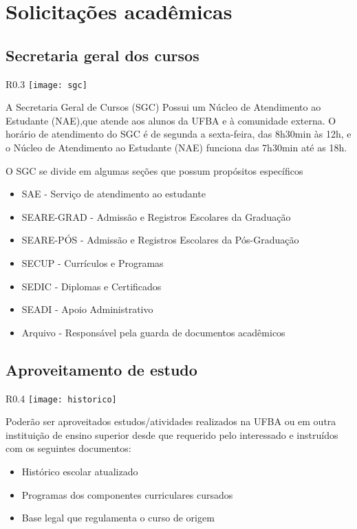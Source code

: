\chapter{Solicitações acadêmicas}
\DoPToC
	\section{Secretaria geral dos cursos}
	   \begin{wrapfigure}{R}{0.3\textwidth}
            \centering
            \texttt{[image: sgc]}
        \end{wrapfigure}
            
A Secretaria Geral de Cursos (SGC) Possui um Núcleo de Atendimento ao Estudante (NAE),que atende aos alunos da UFBA e à comunidade externa. O horário de atendimento do SGC é de segunda a sexta-feira, das 8h30min às 12h, e o Núcleo de Atendimento ao Estudante (NAE) funciona das 7h30min até as 18h.
               
O SGC se divide em algumas seções que possum propósitos específicos

\begin{itemize}
    \item SAE - Serviço de atendimento ao estudante
    \item SEARE-GRAD - Admissão e Registros Escolares da Graduação
    \item SEARE-PÓS - Admissão e Registros Escolares da Pós-Graduação
    \item SECUP - Currículos e Programas
    \item SEDIC - Diplomas e Certificados
    \item SEADI - Apoio Administrativo
    \item Arquivo - Responsável pela guarda de documentos acadêmicos
\end{itemize}


\section{Aproveitamento de estudo}
     \begin{wrapfigure}{R}{0.4\textwidth}
            \centering
            \texttt{[image: historico]}
        \end{wrapfigure}
            Poderão ser aproveitados estudos/atividades realizados na UFBA ou em outra instituição de ensino superior desde que requerido pelo interessado e instruídos com os seguintes documentos:
          \begin{itemize}
              \item Histórico escolar atualizado
                    \item Programas dos componentes curriculares cursados
                    \item Base legal que regulamenta o curso de origem
                \end{itemize}

